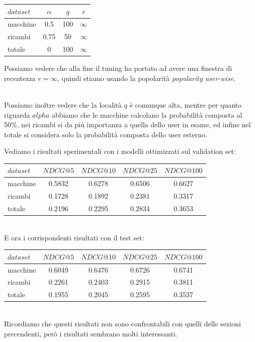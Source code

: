 \begin{minipage}[H]{0.45\textwidth}
    \begin{tabular}{|l|ccc|}
        \toprule
        $dataset$ &    $\alpha$ &  $q$ & $r$ \\
        \midrule
        macchine & 0.5 & 100 & $\infty$ \\
        ricambi  &	0.75 & 50 & $\infty$ \\
        totale  & 0 & 100 & $\infty$ \\
    \bottomrule
    \end{tabular}
\end{minipage}
\begin{minipage}[H]{0.55\textwidth}
    Possiamo vedere che alla fine il tuning ha portato ad avere una finestra di recentezza  $r = \infty$, quindi stiamo usando la popolarità \textit{popularity user-wise}. 
\end{minipage}\\

Possiamo inoltre vedere che la località $q$ è comunque alta, mentre per quanto riguarda $alpha$ abbiamo che le macchine calcolano la probabilità composta al 50\%, nei ricambi si da più importanza a quella dello user in esame, ed infine nel totale si considera solo la probabilità composta dello user esterno.

Vediamo i risultati sperimentali con i modelli ottimizzati sul validation set:\\

\begin{tabular}{|l|cccc|}
    \toprule
    $dataset$  &  $NDCG@5$ & $NDCG@10$  & $NDCG@25$ & $NDCG@100$  \\
    \midrule
    macchine & 0.5832 & 0.6278 & 0.6506 & 0.6627 \\
    ricambi & 0.1728 & 0.1892 & 0.2381 & 0.3317 \\
    totale  & 0.2196 & 0.2295 & 0.2834 & 0.3653 \\
\bottomrule
\end{tabular}\\

E ora i corrispondenti risultati con il test set:\\

\begin{tabular}{|l|cccc|}
    \toprule
    $dataset$  &  $NDCG@5$ & $NDCG@10$  & $NDCG@25$ & $NDCG@100$  \\
    \midrule
    macchine & 0.6049 & 0.6476 & 0.6726 & 0.6741 \\
    ricambi & 0.2261 & 0.2403 & 0.2915 & 0.3811 \\
    totale  & 0.1955 & 0.2045 & 0.2595 & 0.3537 \\
\bottomrule
\end{tabular}\\

Ricordiamo che questi risultati non sono confrontabili con quelli delle sezioni precendenti, però i risultati sembrano molti interessanti.